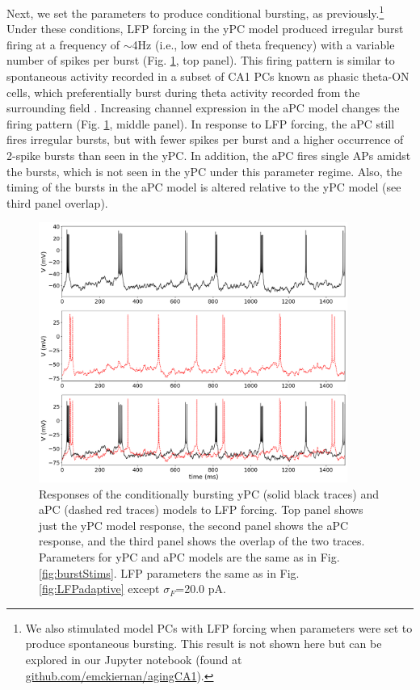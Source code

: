 \documentclass[12pt]{article}
\begin{document}
Next, we set the parameters to produce conditional bursting, as previously.\footnote{We also stimulated model PCs with LFP forcing when parameters were set to produce spontaneous bursting. This result is not shown here but can be explored in our Jupyter notebook (found at \href{https://github.com/emckiernan/agingCA1}{github.com/emckiernan/agingCA1}).} Under these conditions, LFP forcing in the yPC model produced irregular burst firing at a frequency of $\sim$4Hz (i.e., low end of theta frequency) with a variable number of spikes per burst (Fig. \ref{fig:LFPbursting}, top panel). This firing pattern is similar to spontaneous activity recorded in a subset of CA1 PCs known as phasic theta-ON cells, which preferentially burst during theta activity recorded from the surrounding field \citep{bland2002relationship,bland2005heterogeneity,colom1987state}. Increasing {\Ca} channel expression in the aPC model changes the firing pattern (Fig. \ref{fig:LFPbursting}, middle panel). In response to LFP forcing, the aPC still fires irregular bursts, but with fewer spikes per burst and a higher occurrence of 2-spike bursts than seen in the yPC. In addition, the aPC fires single APs amidst the bursts, which is not seen in the yPC under this parameter regime. Also, the timing of the bursts in the aPC model is altered relative to the yPC model (see third panel overlap). 

\begin{figure}[h!]
\centering
\includegraphics[width=0.9\textwidth]{figures/fig8.png}
\caption{Responses of the conditionally bursting yPC (solid black traces) and aPC (dashed red traces) models to LFP forcing. Top panel shows just the yPC model response, the second panel shows the aPC response, and the third panel shows the overlap of the two traces. Parameters for yPC and aPC models are the same as in Fig. \ref{fig:burstStims}. LFP parameters the same as in Fig. \ref{fig:LFPadaptive} except $\sigma_{F}$=20.0 pA.}
\label{fig:LFPbursting}
\end{figure}
\end{document}
